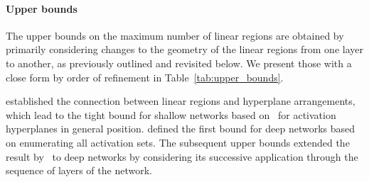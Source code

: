 \paragraph{Upper bounds}

The upper bounds on the maximum number of linear regions are obtained by primarily considering changes to the geometry of the linear regions from one layer to another, as previously outlined and revisited below. 
We present those with a close form by order of refinement in Table~\ref{tab:upper_bounds}. 

\cite{pascanu2013on} established the connection between linear regions and hyperplane arrangements, 
which lead to the tight bound for shallow networks based on~\cite{Zaslavsky1975} for activation hyperplanes in general position. 
\cite{montufar2014on} defined the first bound for deep networks based on enumerating all activation sets. 
The subsequent upper bounds extended the result by~\cite{pascanu2013on} to deep networks by considering its successive application through the sequence of layers of the network. 

